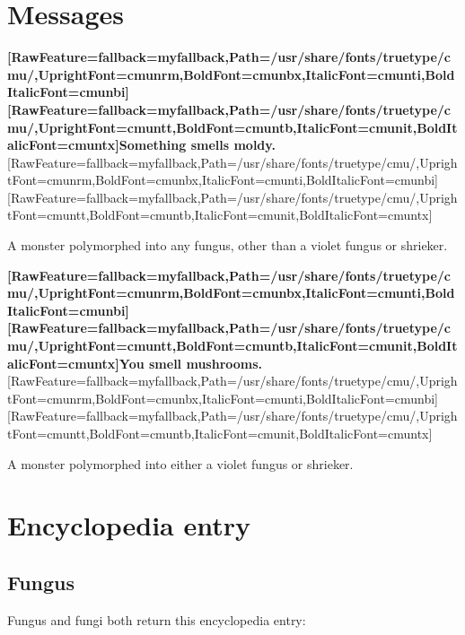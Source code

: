 \section{Messages}
\label{9}
{\bfseries \allowbreak{}\setmainfont{cmunbx.ttf}[RawFeature={fallback=myfallback},Path=/usr/share/fonts/truetype/cmu/,UprightFont=cmunrm,BoldFont=cmunbx,ItalicFont=cmunti,BoldItalicFont=cmunbi]\setmonofont{cmunbx.ttf}[RawFeature={fallback=myfallback},Path=/usr/share/fonts/truetype/cmu/,UprightFont=cmuntt,BoldFont=cmuntb,ItalicFont=cmunit,BoldItalicFont=cmuntx]\bfseries Something smells moldy.}\allowbreak{}\setmainfont{cmunrm.ttf}[RawFeature={fallback=myfallback},Path=/usr/share/fonts/truetype/cmu/,UprightFont=cmunrm,BoldFont=cmunbx,ItalicFont=cmunti,BoldItalicFont=cmunbi]\setmonofont{cmunrm.ttf}[RawFeature={fallback=myfallback},Path=/usr/share/fonts/truetype/cmu/,UprightFont=cmuntt,BoldFont=cmuntb,ItalicFont=cmunit,BoldItalicFont=cmuntx]

\begin{myquote}
\item{}A monster polymorphed into any fungus, other than a violet fungus or shrieker.
\end{myquote}

{\bfseries \allowbreak{}\setmainfont{cmunbx.ttf}[RawFeature={fallback=myfallback},Path=/usr/share/fonts/truetype/cmu/,UprightFont=cmunrm,BoldFont=cmunbx,ItalicFont=cmunti,BoldItalicFont=cmunbi]\setmonofont{cmunbx.ttf}[RawFeature={fallback=myfallback},Path=/usr/share/fonts/truetype/cmu/,UprightFont=cmuntt,BoldFont=cmuntb,ItalicFont=cmunit,BoldItalicFont=cmuntx]\bfseries You smell mushrooms.}\allowbreak{}\setmainfont{cmunrm.ttf}[RawFeature={fallback=myfallback},Path=/usr/share/fonts/truetype/cmu/,UprightFont=cmunrm,BoldFont=cmunbx,ItalicFont=cmunti,BoldItalicFont=cmunbi]\setmonofont{cmunrm.ttf}[RawFeature={fallback=myfallback},Path=/usr/share/fonts/truetype/cmu/,UprightFont=cmuntt,BoldFont=cmuntb,ItalicFont=cmunit,BoldItalicFont=cmuntx]

\begin{myquote}
\item{}A monster polymorphed into either a violet fungus or shrieker.
\end{myquote}

\section{Encyclopedia entry}
\label{20}
\subsection{Fungus}
\label{21}
Fungus and fungi both return this encyclopedia\footnotemark[153] entry:



